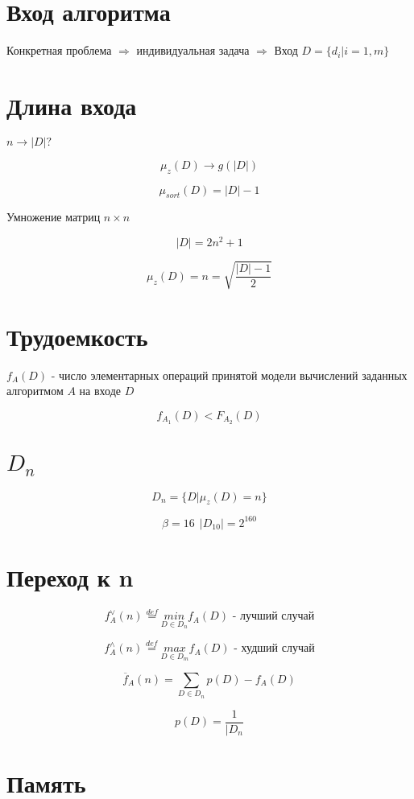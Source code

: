 \documentclass[a4paper, 14pt]{report}
\begin{document}
\section{Вход алгоритма}

Конкретная проблема $\Rightarrow$ индивидуальная задача $\Rightarrow$ Вход
$D = \{ d_i | i = 1,m \}$

\section{Длина входа}

$n \to |D| ?$

$$
\mu_z (D) \to g(|D|)
$$

$$
\mu_{sort} (D) = |D| - 1
$$

Умножение матриц $n \times n$

$$
|D| = 2n^2 + 1
$$

$$
\mu_z(D) = n = \sqrt{\frac{|D| - 1}{2}}
$$

\section{Трудоемкость}

$f_A(D)$ - число элементарных операций принятой модели вычислений заданных
алгоритмом $A$ на входе $D$

$$
f_{A_1} (D) < F_{A_2} (D)
$$

\section{$D_n$}

$$
D_n = \{ D | \mu_z(D) = n \}
$$

$$
\beta = 16\ \ |D_{10}| = 2^{160}
$$

\section{Переход к n}

$$
f_A^\vee(n) \overset{def}{=} \underset{D \in D_n}{min} f_A(D) \text{ - лучший случай}
$$

$$
f_A^\wedge(n) \overset{def}{=} \underset{D \in D_m}{max} f_A(D) \text{ - худший случай}
$$

$$
\overline{f}_A(n) = \sum_{D \in D_n} p(D) - f_A(D)
$$

$$
p(D) = \frac{1}{|D_n}
$$

\section{Память}
\end{document}
